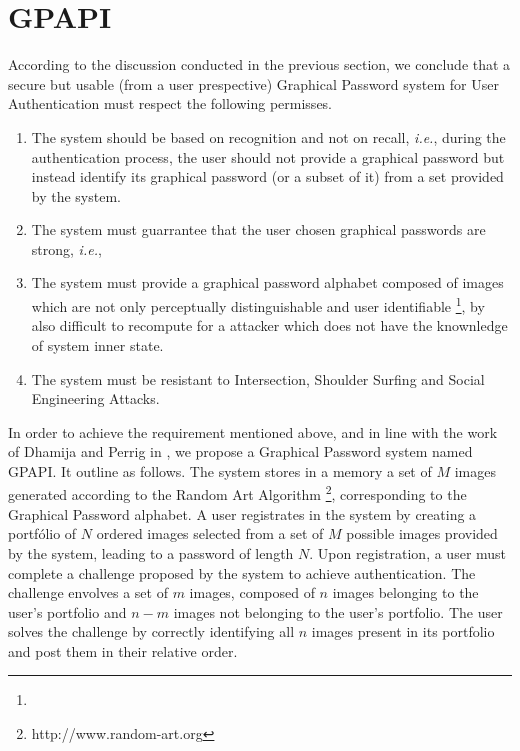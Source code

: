 \documentclass[11pt,a4paper]{article}
\theoremstyle{defn, nobreak=true}
\newcommand{\ie}{\emph{i.e.}}
\begin{document}
\section{GPAPI} \label{sec:gpapi}

According to the discussion conducted in the previous section, we conclude that a secure but usable (from a user prespective) Graphical Password system for User Authentication must respect the following permisses.

\begin{enumerate}

\item The system should be based on recognition and not on recall, \ie, during the authentication process, the user should not provide a graphical password but instead identify its graphical password (or a subset of it) from a set provided by the system.

\item The system must guarrantee that the user chosen graphical passwords are strong, \ie, 

\item The system must provide a graphical password alphabet composed of images which are not only perceptually distinguishable and user identifiable \footnote{}, by also difficult to recompute for a attacker which does not have the knownledge of system inner state. 

\item The system must be resistant to Intersection, Shoulder Surfing and Social Engineering Attacks. 

\end{enumerate}

In order to achieve the requirement mentioned above, and in line with the work of Dhamija and Perrig in \cite{dejavu}, we propose a Graphical Password system named GPAPI. It outline as follows. The system stores in a memory a set of $M$ images generated according to the Random Art Algorithm \footnote{http://www.random-art.org}, corresponding to the Graphical Password alphabet. A user registrates in the system by creating a portfólio of $N$ ordered images selected from a set of $M$ possible images provided by the system, leading to a password of length $N$. Upon registration, a user must complete a challenge proposed by the system to achieve authentication. The challenge envolves a set of $m$ images, composed of $n$ images belonging to the user's portfolio and $n-m$ images not belonging to the user's portfolio. The user solves the challenge by correctly identifying all $n$ images present in its portfolio and post them in their relative order. 
\end{document}
